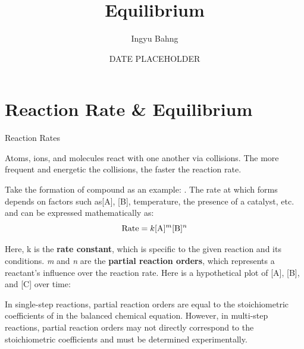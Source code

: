 \documentclass[10pt]{article}
\title{Equilibrium}
\date{DATE PLACEHOLDER}
\author{Ingyu Bahng}
\begin{document}


\section{Reaction Rate \& Equilibrium}

  \begin{core}[label=placeholder1]{Reaction Rates}

    Atoms, ions, and molecules react with one another via collisions. The more frequent and energetic the collisions, the faster the reaction rate.

    Take the formation of compound  as an example: . The rate at which  forms depends on factors such as[A], [B], temperature, the presence of a catalyst, etc. and can be expressed mathematically as: 
    \[
      \text{Rate} = k[\ce{A}]^m[\ce{B}]^n
    \]

    Here, k is the \textbf{rate constant}, which is specific to the given reaction and its conditions. \textit{m} and \textit{n} are the \textbf{partial reaction orders}, which represents a reactant's influence over the reaction rate. Here is a hypothetical plot of [A], [B], and [C] over time:

    
    In single-step reactions, partial reaction orders are equal to the stoichiometric coefficients of in the balanced chemical equation. However, in multi-step reactions, partial reaction orders may not directly correspond to the stoichiometric coefficients and must be determined experimentally.

  \end{core}
  
\end{document}
